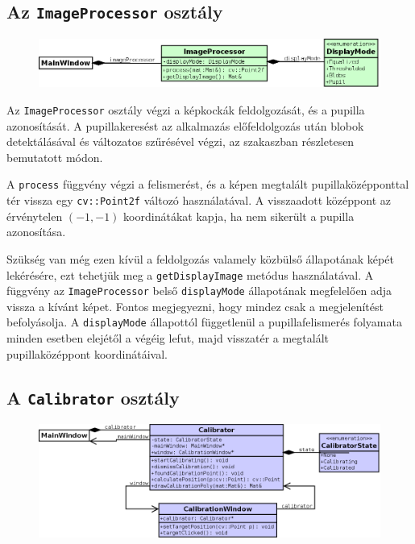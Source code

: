 \subsection{Az \texttt{ImageProcessor} osztály}\label{sect:imageprocessor}

\begin{figure}[!ht]
\centering
\includegraphics[width=140mm, keepaspectratio]{figures/class_imageprocessor.png}
\end{figure}

Az \texttt{ImageProcessor} osztály végzi a képkockák feldolgozását, és a pupilla azonosítását. A pupillakeresést az alkalmazás előfeldolgozás után blobok detektálásával és változatos szűrésével végzi, az  szakaszban részletesen bemutatott módon.

A \texttt{process} függvény végzi a felismerést, és a képen megtalált pupillaközépponttal tér vissza egy \texttt{cv::Point2f} változó használatával. A visszaadott középpont az érvénytelen $(-1, -1)$ koordinátákat kapja, ha nem sikerült a pupilla azonosítása.

Szükség van még ezen kívül a feldolgozás valamely közbülső állapotának képét lekérésére, ezt tehetjük meg a \texttt{getDisplayImage} metódus használatával. A függvény az \texttt{ImageProcessor} belső \texttt{displayMode} állapotának megfelelően adja vissza a kívánt képet. Fontos megjegyezni, hogy mindez csak a megjelenítést befolyásolja. A \texttt{displayMode} állapottól függetlenül a pupillafelismerés folyamata minden esetben elejétől a végéig lefut, majd visszatér a megtalált pupillaközéppont koordinátáival.
 
\subsection{A \texttt{Calibrator} osztály}\label{sect:calibrator}

\begin{figure}[!ht]
\centering
\includegraphics[width=140mm, keepaspectratio]{figures/class_calibrator.png}
\end{figure}

